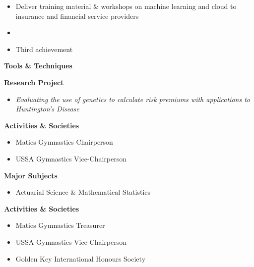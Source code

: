 \documentclass[10pt,a4paper,ragged2e,withhyper]{altacv}
\begin{document}
\begin{paracol}{2}
            \begin{itemize}
	      \item Deliver training material \& workshops on machine learning and cloud to insurance and financial service providers
              \item 
              \item Third achievement
            \end{itemize}
	    \textbf{Tools \& Techniques}
        
            \divider
            
        
	    \textbf{Research Project}
            \begin{itemize}
                \item \textit{Evaluating the use of genetics to calculate risk premiums with applications to Huntington's Disease}
            \end{itemize}
	    \textbf{Activities \& Societies}
            \begin{itemize}
	      \item Maties Gymnastics Chairperson
	      \item USSA Gymnastics Vice-Chairperson
            \end{itemize}
            \divider
            
	    \textbf{Major Subjects}
            \begin{itemize}
	      \item Actuarial Science \& Mathematical Statistics
            \end{itemize}
	    \textbf{Activities \& Societies}
            \begin{itemize}
	      \item Maties Gymnastics Treasurer
	      \item USSA Gymnastics Vice-Chairperson
	      \item Golden Key International Honours Society 
            \end{itemize}
        

\end{paracol}
\end{document}
